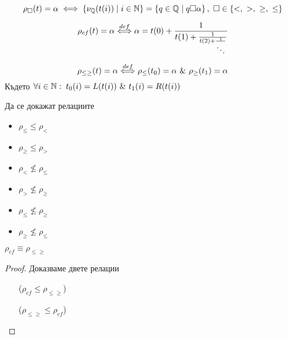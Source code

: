 \begin{definition}
    \begin{equation}
        \rho_\square(t) = \alpha \iff \left\{ \nu_{\mathbb{Q}}(t(i)) \mid i \in {\mathbb{N}} \right\} =  \left\{ q \in {\mathbb{Q}} \mid q \square \alpha \right\},\ \square \in \{<,\ >,\ \geq,\ \leq\}
    \end{equation}
\end{definition}
\begin{definition}
    \begin{equation}
        \rho_{cf}(t) = \alpha {\overset{def}{\iff}} \alpha = t(0) + \frac{1}{t(1) + \frac{1}{t(2) + \frac{1}{\ddots}}}
    \end{equation}
\end{definition}
\begin{definition}
    \begin{equation}
        \rho_{\leq\geq}(t) = \alpha {\overset{def}{\iff}} \rho_\leq(t_0) = \alpha\ \&\ \rho_\geq(t_1) = \alpha
    \end{equation}
    Където $\forall i \in \N:\; t_0(i) = L(t(i))\ \&\ t_1(i) = R(t(i))$
\end{definition}
\begin{problem}
    Да се докажат релациите
\begin{itemize}
    \item $\rho_\leq \leq \rho_<$
    \item $\rho_\geq \leq \rho_>$
    \item $\rho_< \not\leq \rho_\leq$
    \item $\rho_> \not\leq \rho_\geq$
    \item $\rho_\leq \not\leq \rho_\geq$
    \item $\rho_\geq \not\leq \rho_\leq$
\end{itemize}
\end{problem}
\begin{problem}
    $\rho_{cf} \equiv \rho_{\leq\geq}$
\end{problem}
\begin{proof}
    Доказваме двете релации
    \begin{itemize}
        \item[($\rho_{cf} \leq \rho_{\leq\geq}$)]
        \item[($\rho_{\leq\geq} \leq \rho_{cf}$)]
    \end{itemize}
\end{proof}